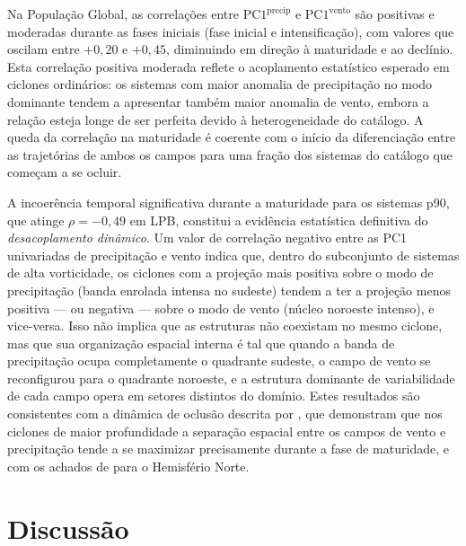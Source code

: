 

Na População Global, as correlações entre $\text{PC1}^{\text{precip}}$ e $\text{PC1}^{\text{vento}}$ são positivas e moderadas durante as fases iniciais (fase inicial e intensificação), com valores que oscilam entre $+0,20$ e $+0,45$, diminuindo em direção à maturidade e ao declínio. Esta correlação positiva moderada reflete o acoplamento estatístico esperado em ciclones ordinários: os sistemas com maior anomalia de precipitação no modo dominante tendem a apresentar também maior anomalia de vento, embora a relação esteja longe de ser perfeita devido à heterogeneidade do catálogo. A queda da correlação na maturidade é coerente com o início da diferenciação entre as trajetórias de ambos os campos para uma fração dos sistemas do catálogo que começam a se ocluir.

A incoerência temporal significativa durante a maturidade para os sistemas p90, que atinge $\rho = -0,49$ em LPB, constitui a evidência estatística definitiva do \textit{desacoplamento dinâmico}. Um valor de correlação negativo entre as PC1 univariadas de precipitação e vento indica que, dentro do subconjunto de sistemas de alta vorticidade, os ciclones com a projeção mais positiva sobre o modo de precipitação (banda enrolada intensa no sudeste) tendem a ter a projeção menos positiva — ou negativa — sobre o modo de vento (núcleo noroeste intenso), e vice-versa. Isso não implica que as estruturas não coexistam no mesmo ciclone, mas que sua organização espacial interna é tal que quando a banda de precipitação ocupa completamente o quadrante sudeste, o campo de vento se reconfigurou para o quadrante noroeste, e a estrutura dominante de variabilidade de cada campo opera em setores distintos do domínio. Estes resultados são consistentes com a dinâmica de oclusão descrita por \citet{sinclair2023relationship}, que demonstram que nos ciclones de maior profundidade a separação espacial entre os campos de vento e precipitação tende a se maximizar precisamente durante a fase de maturidade, e com os achados de \citet{chen2025characteristics} para o Hemisfério Norte.

\section{Discussão}
\label{sec:discusion_meof}

